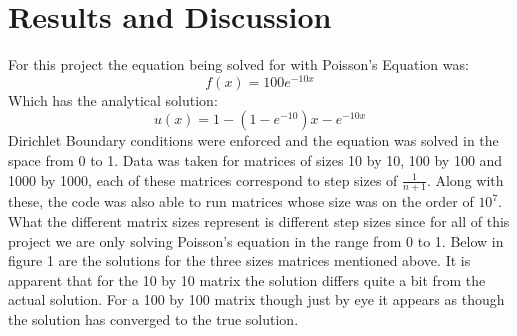 \documentclass[12pt,righttag]{article}
\begin{document}
	\section{Results and Discussion}
	
	For this project the equation being solved for with Poisson's Equation was:
	\[f(x)=100e^{-10x}\]
	Which has the analytical solution:
	\[u(x)=1-(1-e^{-10})x-e^{-10x}\]
	Dirichlet Boundary conditions were enforced and the equation was solved in the space from 0 to 1. Data was taken for matrices of sizes 10 by 10, 100 by 100 and 1000 by 1000, each of these matrices correspond to step sizes of $\frac{1}{n+1}$. Along with these, the code was also able to run matrices whose size was on the order of $10^7$. What the different matrix sizes represent is different step sizes since for all of this project we are only solving Poisson's equation in the range from 0 to 1. Below in figure 1 are the solutions for the three sizes matrices mentioned above. It is apparent that for the 10 by 10 matrix the solution differs quite a bit from the actual solution. For a 100 by 100 matrix though just by eye it appears as though the solution has converged to the true solution.
	
\end{document}
